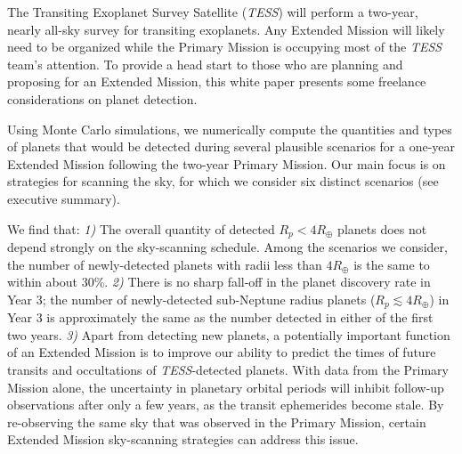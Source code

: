 \documentclass{article}
\begin{document}
The Transiting Exoplanet Survey Satellite (\textit{TESS}) will perform a
two-year, nearly all-sky survey for transiting exoplanets.  Any Extended
Mission will likely need to be organized while the Primary Mission is occupying
most of the \textit{TESS} team's attention.  To provide a head start to those
who are planning and proposing for an Extended Mission, this white paper
presents some freelance considerations on planet detection.

Using Monte Carlo simulations, we numerically compute the quantities and types
of planets that would be detected during several plausible scenarios for a
one-year Extended Mission following the two-year Primary Mission. Our main
focus is on strategies for scanning the sky, for which we consider six
distinct scenarios (see executive summary). 

We find that: \textit{1)} The overall quantity of detected $R_p<4R_\oplus$
planets does not depend strongly on the sky-scanning schedule.  Among the
scenarios we consider, the number of newly-detected planets with radii less
than $4R_\oplus$ is the same to within about 30\%.  \textit{2)} There is no
sharp fall-off in the planet discovery rate in Year 3; the number of
newly-detected sub-Neptune radius planets ($R_p \lesssim 4R_\oplus$) in Year 3
is approximately the same as the number detected in either of the first two
years.
\textit{3)} Apart from detecting new planets, a potentially important function
of an Extended Mission is to improve our ability to predict the times of future
transits and occultations of {\it TESS}-detected planets.  With data from the
Primary Mission alone, the uncertainty in planetary orbital periods will
inhibit follow-up observations after only a few years, as the transit
ephemerides become stale. By re-observing the same sky that was observed in the
Primary Mission, certain Extended Mission sky-scanning strategies can address
this issue.
\end{document}
